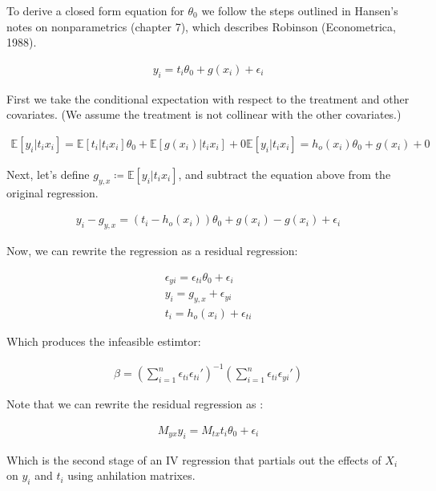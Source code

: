 \documentclass[12pt]{article}
\newcommand{\E}{\mathbb{E}}
\begin{document}
To derive a closed form equation for $\theta_0$ we follow the steps outlined in Hansen's notes on nonparametrics (chapter 7), which describes Robinson (Econometrica, 1988).

\begin{gather*}
y_i = t_i\theta_0 + g(x_i) + \epsilon_i
\end{gather*}

First we take the conditional expectation with respect to the treatment and other covariates. (We assume the treatment is not collinear with the other covariates.)

\begin{gather*}
\E[y_i|t_i x_i] = \E[t_i|t_i x_i]\theta_0 + \E[g(x_i)|t_i x_i]  + 0
\E[y_i|t_i x_i] = h_o(x_i)\theta_0 + g(x_i) + 0
\end{gather*}

Next, let's define $ g_{y,x}  \coloneqq \E[y_i|t_i x_i]$, and subtract the equation above from the original regression.


\begin{gather*}
y_i - g_{y,x} = (t_i -  h_o(x_i))\theta_0 + g(x_i) - g(x_i) + \epsilon_i
\end{gather*}

Now, we can rewrite the regression as a residual regression:

\begin{gather*}
\epsilon_{yi} =  \epsilon_{ti}\theta_0 + \epsilon_i\\
y_i = g_{y,x} + \epsilon_{yi}\\
t_i =  h_o(x_i) + \epsilon_{ti}
\end{gather*}

Which produces the infeasible estimtor:

\begin{gather*}
\beta = \left( \sum\limits_{i=1}^n \epsilon_{ti} \epsilon_{ti}' \right)^{-1} \left( \sum\limits_{i=1}^n \epsilon_{ti} \epsilon_{yi}' \right)
\end{gather*}

Note that we can rewrite the residual regression as :

\begin{gather*}
M_{yx} y_i = M_{tx} t_i \theta_0 + \epsilon_i
\end{gather*}

Which is the second stage of an IV regression that partials out the effects of $X_i$ on $y_i$ and $t_i$ using anhilation matrixes.

\subsection{}
\end{document}
